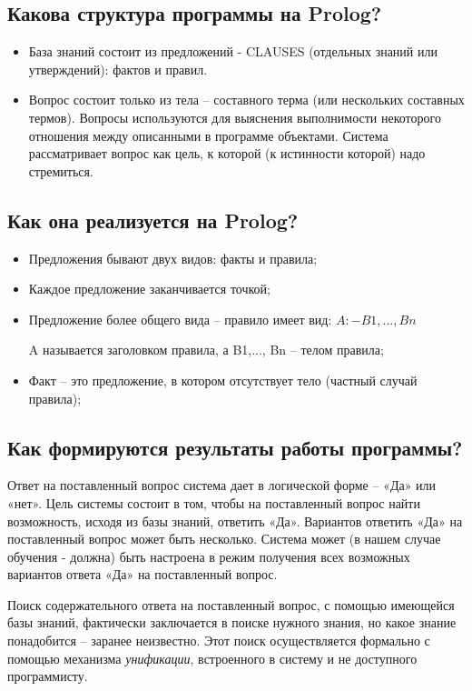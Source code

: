 \documentclass[a4paper,12pt]{article}
\begin{document}
	\subsection{Какова структура программы на Prolog?}
	
		\begin{itemize}
		\item База знаний состоит из предложений - CLAUSES (отдельных знаний или утверждений): фактов и правил.
		
		\item Вопрос состоит только из тела – составного терма (или нескольких составных термов). Вопросы используются для выяснения выполнимости некоторого отношения между описанными в программе объектами. Система рассматривает вопрос как цель, к которой (к истинности которой) надо стремиться.
	\end{itemize}
	
	\subsection{Как она реализуется на Prolog?}
	
	\begin{itemize}
		\item Предложения бывают двух видов: факты и правила;
		\item Каждое предложение заканчивается точкой;
		\item Предложение более общего вида – правило имеет вид:
$A :- B1,... , Bn$
		
		A называется заголовком правила, а B1,..., Bn – телом правила;
		\item Факт – это предложение, в котором отсутствует тело (частный случай правила);
	\end{itemize}
	
	
	\subsection{Как формируются результаты работы программы?}
	
	Ответ на поставленный вопрос система дает в логической форме – «Да» или «нет». Цель системы состоит в том, чтобы на поставленный вопрос найти возможность, исходя из базы знаний, ответить «Да». Вариантов ответить «Да» на поставленный вопрос может быть несколько. Система может (в нашем случае обучения - должна) быть  настроена в режим получения всех возможных вариантов ответа «Да» на поставленный вопрос.
	
	Поиск содержательного ответа на поставленный вопрос, с помощью имеющейся базы знаний, фактически заключается в поиске нужного знания, но какое знание понадобится – заранее неизвестно. Этот поиск осуществляется формально с помощью механизма \textit{унификации}, встроенного в систему и не доступного программисту. 
	
\end{document}
